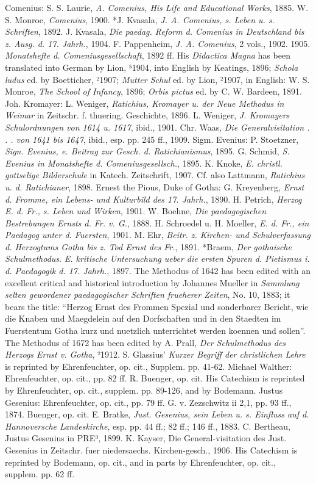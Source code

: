 Comenius: S. S. Laurie, \emph{A. Comenius, His Life and Educational Works}, 1885. W. S. Monroe, \emph{Comenius}, 1900. *J. Kvasala, \emph{J. A. Comenius, s. Leben u. s. Schriften}, 1892. J. Kvasala, \emph{Die paedag. Reform d. Comenius in Deutschland bis z. Ausg. d. 17. Jahrh.}, 1904. F. Pappenheim, \emph{J. A. Comenius}, 2 vols., 1902. 1905. \emph{Monatshefte d. Comeniusgesellschaft}, 1892 ff. His \emph{Didactica Magna} has been translated into German by Lion, ⁵1904, into English by Keatings, 1896; \emph{Schola ludus} ed. by Boetticher, ²1907; \emph{Mutter Schul} ed. by Lion, ²1907, in English: W. S. Monroe, \emph{The School of Infancy}, 1896; \emph{Orbis pictus} ed. by C. W. Bardeen, 1891. Joh. Kromayer: L. Weniger, \emph{Ratichius, Kromayer u. der Neue Methodus in Weimar} in Zeitschr. f. thuering. Geschichte, 1896. L. Weniger, \emph{J. Kromayers Schulordnungen von 1614 u. 1617}, ibid., 1901. Chr. Waas, \emph{Die Generalvisitation . . . von 1641 bis 1647}, ibid., esp. pp. 245 ff., 1909. Sigm. Evenius: P. Stoetzner, \emph{Sign. Evenius, e. Beitrag zur Gesch. d. Ratichianismus}, 1895. G. Schmid, \emph{S. Evenius in Monatshefte d. Comeniusgesellsch.}, 1895. K. Knoke, \emph{E. christl. gottselige Bilderschule} in Katech. Zeitschrift, 1907. Cf. also Lattmann, \emph{Ratichius u. d. Ratichianer}, 1898. Ernest the Pious, Duke of Gotha: G. Kreyenberg, \emph{Ernst d. Fromme, ein Lebens- und Kulturbild des 17. Jahrh.}, 1890. H. Petrich, \emph{Herzog E. d. Fr., s. Leben und Wirken}, 1901. W. Boehne, \emph{Die paedagogischen Bestrebungen Ernsts d. Fr. v. G.}, 1888. H. Schroedel u. H. Moeller, \emph{E. d. Fr., ein Paedagog unter d. Fuersten}, 1901. M. Ehr, \emph{Beitr. z. Kirchen- und Schulverfassung d. Herzogtums Gotha bis z. Tod Ernst des Fr.}, 1891. *Braem, \emph{Der gothaische Schulmethodus}. \emph{E. kritische Untersuchung ueber die ersten Spuren d. Pietismus i. d. Paedagogik d. 17. Jahrh.}, 1897. The Methodus of 1642 has been edited with an excellent critical and historical introduction by Johannes Mueller in \emph{Sammlung selten gewordener paedagogischer Schriften frueherer Zeiten}, No. 10, 1883; it bears the title: “Herzog Ernst des Frommen Spezial und sonderbarer Bericht, wie die Knaben und Maegdelein auf den Dorfschaften und in den Staedten im Fuerstentum Gotha kurz und nuetzlich unterrichtet werden koennen und sollen”. The Methodus of 1672 has been edited by A. Prall, \emph{Der Schulmethodus des Herzogs Ernst v. Gotha}, ²1912. S. Glassius’ \emph{Kurzer Begriff der christlichen Lehre} is reprinted by Ehrenfeuchter, op. cit., Supplem. pp. 41-62. Michael Walther: Ehrenfeuchter, op. cit., pp. 82 ff. R. Buenger, op. cit. His Catechism is reprinted by Ehrenfeuchter, op. cit., supplem. pp. 89-126, and by Bodemann. Justus Gesenius: Ehrenfeuchter, op. cit., pp. 79 ff. G. v. Zezschwitz ii 2,1, pp. 93 ff., 1874. Buenger, op. cit. E. Bratke, \emph{Just. Gesenius, sein Leben u. s. Einfluss auf d. Hannoversche Landeskirche}, esp. pp. 44 ff.; 82 ff.; 146 ff., 1883.
C. Bertheau, Justus Gesenius in PRE³, 1899. K. Kayser, Die General-visitation des Just. Gesenius in Zeitschr. fuer niedersaechs. Kirchen-gesch., 1906. His Catechism is reprinted by Bodemann, op. cit., and in parts by Ehrenfeuchter, op. cit., supplem. pp. 62 ff.

